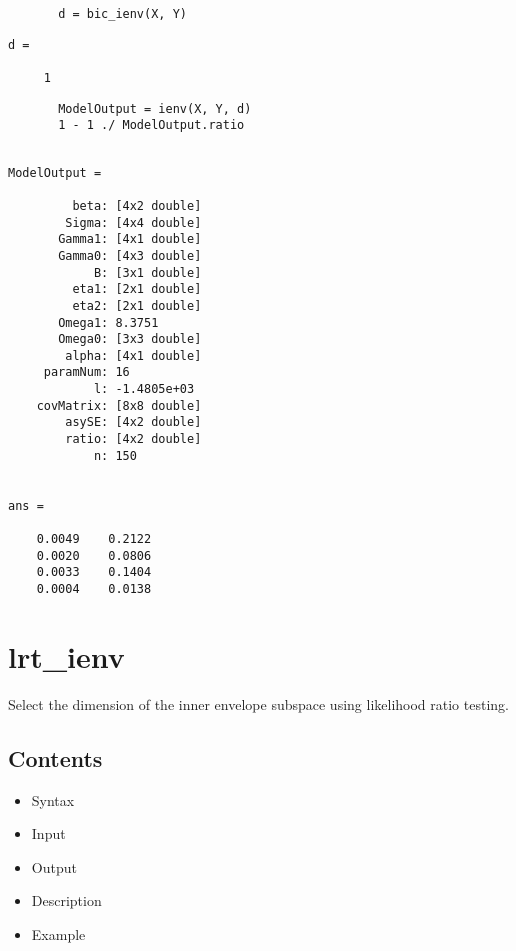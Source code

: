 \documentclass[a4paper,11pt,openany]{memoir}
\begin{document}
\begin{verbatim}       d = bic_ienv(X, Y)\end{verbatim}
        \color{lightgray}\ttfamily \begin{verbatim}
d =

     1
\end{verbatim} \rmfamily
\color{black}
\begin{verbatim}       ModelOutput = ienv(X, Y, d)
       1 - 1 ./ ModelOutput.ratio\end{verbatim}
        \color{lightgray}\ttfamily \begin{verbatim}

ModelOutput = 

         beta: [4x2 double]
        Sigma: [4x4 double]
       Gamma1: [4x1 double]
       Gamma0: [4x3 double]
            B: [3x1 double]
         eta1: [2x1 double]
         eta2: [2x1 double]
       Omega1: 8.3751
       Omega0: [3x3 double]
        alpha: [4x1 double]
     paramNum: 16
            l: -1.4805e+03
    covMatrix: [8x8 double]
        asySE: [4x2 double]
        ratio: [4x2 double]
            n: 150


ans =

    0.0049    0.2122
    0.0020    0.0806
    0.0033    0.1404
    0.0004    0.0138

\end{verbatim} \rmfamily
\color{black}


\newpage


\rmfamily
\color{black}\section{lrt\_ienv}

\begin{par}
Select the dimension of the inner envelope subspace using likelihood ratio testing.
\end{par} \vspace{1em}

\subsection*{Contents}

\begin{itemize}
\setlength{\itemsep}{-1ex}
   \item Syntax
   \item Input
   \item Output
   \item Description
   \item Example
\end{itemize}
\end{document}
